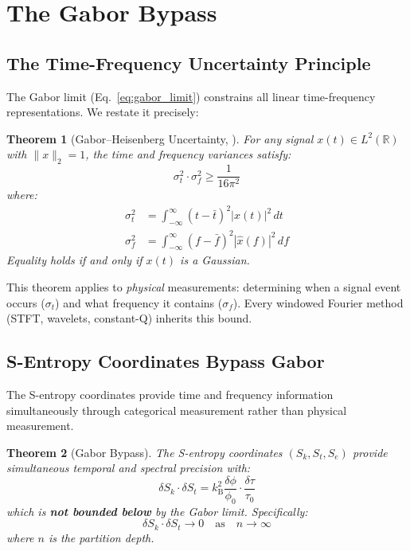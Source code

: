 \documentclass[twocolumn,10pt]{article}
\newtheorem{theorem}{Theorem}[section]
\theoremstyle{remark}
\newcommand{\kB}{k_{\mathrm{B}}}
\newcommand{\Sk}{S_k}
\newcommand{\St}{S_t}
\newcommand{\Se}{S_e}
\begin{document}
\section{The Gabor Bypass}
\label{sec:gabor_bypass}

\subsection{The Time-Frequency Uncertainty Principle}

The Gabor limit (Eq.~\ref{eq:gabor_limit}) constrains all linear time-frequency representations. We restate it precisely:

\begin{theorem}[Gabor--Heisenberg Uncertainty, {\cite{gabor1946, grochenig2001}}]
\label{thm:gabor}
For any signal $x(t) \in L^2(\mathbb{R})$ with $\|x\|_2 = 1$, the time and frequency variances satisfy:
\begin{equation}
    \sigma_t^2 \cdot \sigma_f^2 \geq \frac{1}{16\pi^2}
    \label{eq:gabor_precise}
\end{equation}
where:
\begin{align}
    \sigma_t^2 &= \int_{-\infty}^{\infty} (t - \bar{t})^2 |x(t)|^2 \, dt \label{eq:time_variance} \\
    \sigma_f^2 &= \int_{-\infty}^{\infty} (f - \bar{f})^2 |\hat{x}(f)|^2 \, df \label{eq:freq_variance}
\end{align}
Equality holds if and only if $x(t)$ is a Gaussian.
\end{theorem}

This theorem applies to \textit{physical} measurements: determining when a signal event occurs ($\sigma_t$) and what frequency it contains ($\sigma_f$). Every windowed Fourier method (STFT, wavelets, constant-Q) inherits this bound.

\subsection{S-Entropy Coordinates Bypass Gabor}

The S-entropy coordinates provide time and frequency information simultaneously through categorical measurement rather than physical measurement.

\begin{theorem}[Gabor Bypass]
\label{thm:gabor_bypass}
The S-entropy coordinates $(\Sk, \St, \Se)$ provide simultaneous temporal and spectral precision with:
\begin{equation}
    \delta \Sk \cdot \delta \St = \kB^2 \frac{\delta\phi}{\phi_0} \cdot \frac{\delta\tau}{\tau_0}
    \label{eq:s_entropy_product}
\end{equation}
which is \textbf{not bounded below} by the Gabor limit. Specifically:
\begin{equation}
    \delta \Sk \cdot \delta \St \to 0 \quad \text{as} \quad n \to \infty
    \label{eq:s_product_vanishes}
\end{equation}
where $n$ is the partition depth.
\end{theorem}
\end{document}
